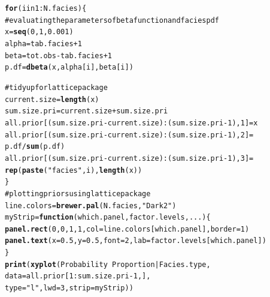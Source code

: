 \documentclass[paper=a4, fontsize=12pt]{scrartcl}\usepackage{graphicx, color}
\makeatletter
\newcommand{\hlfunctioncall}[1]{\textcolor[rgb]{0.501960784313725,0,0.329411764705882}{\textbf{#1}}}%
\newcommand{\hlstring}[1]{\textcolor[rgb]{0.6,0.6,1}{#1}}%
\newcommand{\hlcomment}[1]{\textcolor[rgb]{0.180392156862745,0.6,0.341176470588235}{#1}}%
\newenvironment{kframe}{%
 \def\at@end@of@kframe{}%
 \ifinner\ifhmode%
  \def\at@end@of@kframe{\end{minipage}}%
  \begin{minipage}{\columnwidth}%
 \fi\fi%
 \def\FrameCommand##1{\hskip\@totalleftmargin \hskip-\fboxsep
 \colorbox{shadecolor}{##1}\hskip-\fboxsep
     \hskip-\linewidth \hskip-\@totalleftmargin \hskip\columnwidth}%
 \MakeFramed {\advance\hsize-\width
   \@totalleftmargin\z@ \linewidth\hsize
   \@setminipage}}%
 {\par\unskip\endMakeFramed%
 \at@end@of@kframe}
\newenvironment{knitrout}{}{} %
\numberwithin{equation}{section} %
\numberwithin{figure}{section} %
\numberwithin{table}{section} %
\makeatother
\begin{document}
\begin{knitrout}
\color{fgcolor}\begin{kframe}
\begin{alltt}
\hlfunctioncall{for} (i in 1:N.facies)\{
\hlcomment{  #evaluating the parameters of beta function and facies pdf}
  x     =  \hlfunctioncall{seq}(0,1,0.001)
  alpha = tab.facies+1
  beta  =  tot.obs-tab.facies+1
  p.df  = \hlfunctioncall{dbeta}(x,alpha[i],beta[i])
  
\hlcomment{  #tidy up for lattice package }
  current.size = \hlfunctioncall{length}(x)
  sum.size.pri = current.size+sum.size.pri
  all.prior[(sum.size.pri-current.size):(sum.size.pri-1),1] = x
  all.prior[(sum.size.pri-current.size):(sum.size.pri-1),2] = 
    p.df/\hlfunctioncall{sum}(p.df)
  all.prior[(sum.size.pri-current.size):(sum.size.pri-1),3] =
   \hlfunctioncall{rep}(\hlfunctioncall{paste}(\hlstring{"facies "},i),\hlfunctioncall{length}(x))    
\}
\hlcomment{#plotting priors using lattice package }
line.colors = \hlfunctioncall{brewer.pal}(N.facies,\hlstring{"Dark2"})
myStrip     = \hlfunctioncall{function}(which.panel, factor.levels, ...) \{
  \hlfunctioncall{panel.rect}(0, 0, 1, 1,col = line.colors[which.panel],border = 1)
  \hlfunctioncall{panel.text}(x = 0.5, y = 0.5,font = 2,lab = factor.levels[which.panel])
\}
\hlfunctioncall{print}(\hlfunctioncall{xyplot}(Probability ~ Proportion|Facies.type,
               data = all.prior[1:sum.size.pri-1,],
               type = \hlstring{"l"},lwd = 3,strip = myStrip))
\end{alltt}
\end{kframe}
\end{knitrout}



\end{document}
